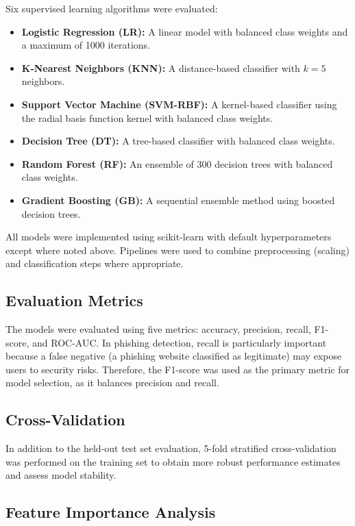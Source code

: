 \documentclass[conference]{IEEEtran}
\begin{document}
Six supervised learning algorithms were evaluated:

\begin{itemize}
    \item \textbf{Logistic Regression (LR):} A linear model with balanced class weights and a maximum of 1000 iterations.
    \item \textbf{K-Nearest Neighbors (KNN):} A distance-based classifier with $k=5$ neighbors.
    \item \textbf{Support Vector Machine (SVM-RBF):} A kernel-based classifier using the radial basis function kernel with balanced class weights.
    \item \textbf{Decision Tree (DT):} A tree-based classifier with balanced class weights.
    \item \textbf{Random Forest (RF):} An ensemble of 300 decision trees with balanced class weights.
    \item \textbf{Gradient Boosting (GB):} A sequential ensemble method using boosted decision trees.
\end{itemize}

All models were implemented using scikit-learn \cite{sklearn2011} with default hyperparameters except where noted above. Pipelines were used to combine preprocessing (scaling) and classification steps where appropriate.

\subsection{Evaluation Metrics}

The models were evaluated using five metrics: accuracy, precision, recall, F1-score, and ROC-AUC. In phishing detection, recall is particularly important because a false negative (a phishing website classified as legitimate) may expose users to security risks. Therefore, the F1-score was used as the primary metric for model selection, as it balances precision and recall.

\subsection{Cross-Validation}

In addition to the held-out test set evaluation, 5-fold stratified cross-validation was performed on the training set to obtain more robust performance estimates and assess model stability.

\subsection{Feature Importance Analysis}
\end{document}
